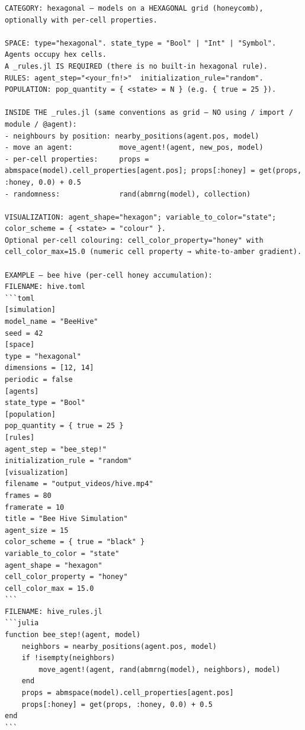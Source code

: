 \begin{lstlisting}[style=cellprompt]
CATEGORY: hexagonal — models on a HEXAGONAL grid (honeycomb), optionally with per-cell properties.

SPACE: type="hexagonal". state_type = "Bool" | "Int" | "Symbol". Agents occupy hex cells.
A _rules.jl IS REQUIRED (there is no built-in hexagonal rule).
RULES: agent_step="<your_fn!>"  initialization_rule="random".
POPULATION: pop_quantity = { <state> = N } (e.g. { true = 25 }).

INSIDE THE _rules.jl (same conventions as grid — NO using / import / module / @agent):
- neighbours by position: nearby_positions(agent.pos, model)
- move an agent:           move_agent!(agent, new_pos, model)
- per-cell properties:     props = abmspace(model).cell_properties[agent.pos]; props[:honey] = get(props, :honey, 0.0) + 0.5
- randomness:              rand(abmrng(model), collection)

VISUALIZATION: agent_shape="hexagon"; variable_to_color="state"; color_scheme = { <state> = "colour" }.
Optional per-cell colouring: cell_color_property="honey" with cell_color_max=15.0 (numeric cell property → white-to-amber gradient).

EXAMPLE — bee hive (per-cell honey accumulation):
FILENAME: hive.toml
```toml
[simulation]
model_name = "BeeHive"
seed = 42
[space]
type = "hexagonal"
dimensions = [12, 14]
periodic = false
[agents]
state_type = "Bool"
[population]
pop_quantity = { true = 25 }
[rules]
agent_step = "bee_step!"
initialization_rule = "random"
[visualization]
filename = "output_videos/hive.mp4"
frames = 80
framerate = 10
title = "Bee Hive Simulation"
agent_size = 15
color_scheme = { true = "black" }
variable_to_color = "state"
agent_shape = "hexagon"
cell_color_property = "honey"
cell_color_max = 15.0
```
FILENAME: hive_rules.jl
```julia
function bee_step!(agent, model)
    neighbors = nearby_positions(agent.pos, model)
    if !isempty(neighbors)
        move_agent!(agent, rand(abmrng(model), neighbors), model)
    end
    props = abmspace(model).cell_properties[agent.pos]
    props[:honey] = get(props, :honey, 0.0) + 0.5
end
```
\end{lstlisting}

